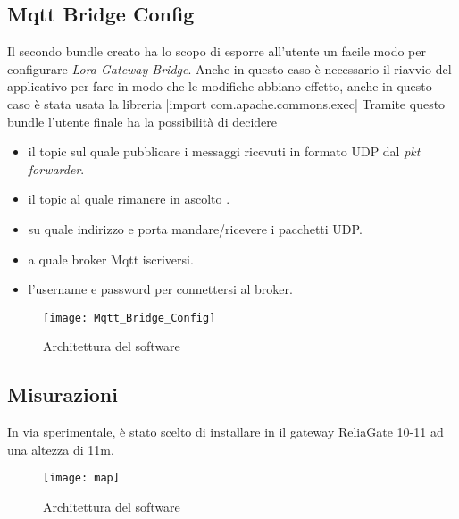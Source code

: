 \subsection{Mqtt Bridge Config}
Il secondo bundle creato ha lo scopo di esporre all'utente un facile modo per
configurare  \emph{Lora Gateway Bridge}.  Anche in questo caso è necessario il
riavvio del applicativo per fare in modo che le modifiche abbiano effetto, anche
in questo caso è stata usata la libreria
|import com.apache.commons.exec|
Tramite questo bundle l'utente finale ha la possibilità di decidere 
\begin{itemize}
\item il topic sul quale pubblicare i messaggi ricevuti in formato UDP dal
\emph{pkt forwarder}.
\item il topic al quale rimanere in ascolto .
\item su quale indirizzo e porta mandare/ricevere i pacchetti UDP.
\item a quale broker Mqtt iscriversi.
\item l'username e password per connettersi al broker.
\end{itemize}

\begin{figure}[h]
\centering 
\texttt{[image: Mqtt\_Bridge\_Config]}
\caption{Architettura del software}
\label{fig:Software_stack}
\end{figure}

\subsection{Misurazioni}
In via sperimentale, è stato scelto di installare in  il gateway
ReliaGate 10-11 ad una altezza di 11m. 
\begin{figure}[h]
\centering 
\texttt{[image: map]}
\caption{Architettura del software}
\label{fig:Software_stack}
\end{figure}
